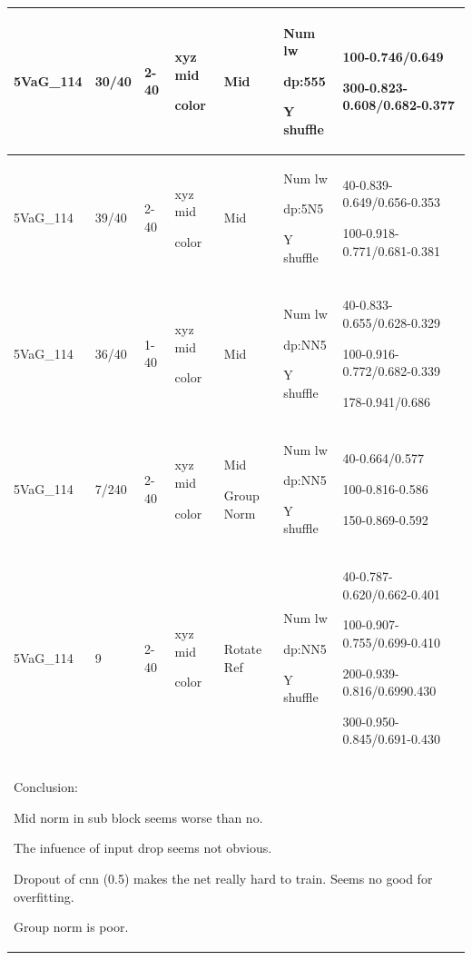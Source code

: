 \documentclass{article}
\begin{document}
\begin{tabular}{|p{1.5cm}|p{1.5cm}|p{1cm}|p{1.5cm}|p{1.5cm}|p{1.5cm}|p{5cm}| }
	5VaG\_114 & 30/40 &2-40 & xyz mid\par color & Mid & Num lw\par dp:555\par Y shuffle &100-0.746/0.649\par 300-0.823-0.608/0.682-0.377\\
	\hline
	5VaG\_114 & 39/40 &2-40 & xyz mid\par color & Mid & Num lw\par dp:5N5\par Y shuffle &40-0.839-0.649/0.656-0.353\par 100-0.918-0.771/0.681-0.381\par\\
	\hline
	5VaG\_114 & 36/40 &1-40 & xyz mid\par color & Mid & Num lw\par dp:NN5\par Y shuffle &40-0.833-0.655/0.628-0.329\par 100-0.916-0.772/0.682-0.339\par 178-0.941/0.686\\
	\hline
	5VaG\_114 & 7/240 &2-40 & xyz mid\par color & Mid \par Group Norm& Num lw\par dp:NN5\par Y shuffle &40-0.664/0.577\par 100-0.816-0.586\par 150-0.869-0.592\\
	\hline\hline
	5VaG\_114 & 9 &2-40 & xyz mid\par color & Rotate Ref & Num lw\par dp:NN5\par Y shuffle &40-0.787-0.620/0.662-0.401\par 100-0.907-0.755/0.699-0.410\par 200-0.939-0.816/0.6990.430\par 300-0.950-0.845/0.691-0.430\\
	\hline
	
	\multicolumn{7}{|p{14cm}|}{ Conclusion:\par	
		Mid norm in sub block seems worse than no. \par 
		The infuence of input drop seems not obvious. \par 
		Dropout of cnn (0.5) makes the net really hard to train. Seems no good for overfitting.\par 
		Group norm is poor.   } \\
	\hline
\end{tabular}	
\end{document}
